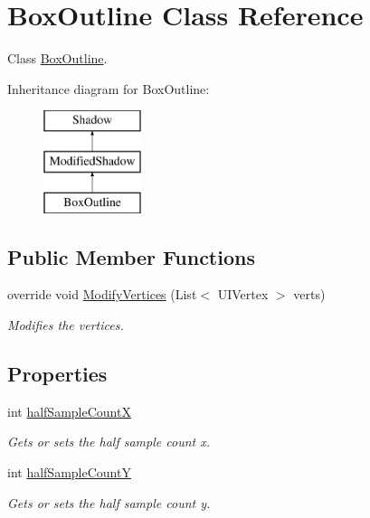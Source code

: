 \hypertarget{class_box_outline}{}\section{Box\+Outline Class Reference}
\label{class_box_outline}


Class \hyperlink{class_box_outline}{Box\+Outline}.  


Inheritance diagram for Box\+Outline\+:\begin{figure}[H]
\begin{center}
\leavevmode
\includegraphics[height=3.000000cm]{class_box_outline}
\end{center}
\end{figure}
\subsection*{Public Member Functions}
\begin{DoxyCompactItemize}
\item 
override void \hyperlink{class_box_outline_a2f73aa9d45a23d039aeff7a33a322019}{Modify\+Vertices} (List$<$ U\+I\+Vertex $>$ verts)
\begin{DoxyCompactList}\small\item\em Modifies the vertices. \end{DoxyCompactList}\end{DoxyCompactItemize}
\subsection*{Properties}
\begin{DoxyCompactItemize}
\item 
int \hyperlink{class_box_outline_a7a2b303e8572fffaf5384730964de22c}{half\+Sample\+CountX}
\begin{DoxyCompactList}\small\item\em Gets or sets the half sample count x. \end{DoxyCompactList}\item 
int \hyperlink{class_box_outline_a9c6dcbe45e4be7b977a063ffdcdc851e}{half\+Sample\+CountY}
\begin{DoxyCompactList}\small\item\em Gets or sets the half sample count y. \end{DoxyCompactList}\end{DoxyCompactItemize}
